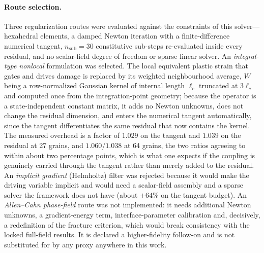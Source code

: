 \documentclass[12pt,a4paper,twocolumn]{article}
\begin{document}
\paragraph{Route selection.} Three regularization routes were evaluated against the constraints of this
solver---hexahedral elements, a damped Newton iteration with a finite-difference numerical tangent,
$n_{\mathrm{sub}} = 30$ constitutive sub-steps re-evaluated inside every residual, and no scalar-field degree
of freedom or sparse linear solver. An \emph{integral-type nonlocal} formulation was selected. The local
equivalent plastic strain that gates and drives damage is replaced by its weighted neighbourhood average, $W$
being a row-normalized Gaussian kernel of internal length $\ell_c$ truncated at $3\ell_c$ and computed once
from the integration-point geometry; because the operator is a state-independent constant matrix, it adds no
Newton unknowns, does not change the residual dimension, and enters the numerical tangent automatically, since
the tangent differentiates the same residual that now contains the kernel. The measured overhead is a factor
of $1.029$ on the tangent and $1.039$ on the residual at 27 grains, and $1.060$/$1.038$ at 64 grains, the two
ratios agreeing to within about two percentage points, which is what one expects if the coupling is genuinely
carried through the tangent rather than merely added to the residual. An \emph{implicit gradient} (Helmholtz)
filter was rejected because it would make the driving variable implicit and would need a scalar-field assembly
and a sparse solver the framework does not have (about $+64\%$ on the tangent budget). An \emph{Allen--Cahn
phase-field} route was not implemented: it needs additional Newton unknowns, a gradient-energy term,
interface-parameter calibration and, decisively, a redefinition of the fracture criterion, which would break
consistency with the locked full-field results. It is declared a higher-fidelity follow-on and is not
substituted for by any proxy anywhere in this work.
\end{document}
